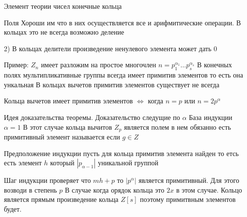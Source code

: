 Элемент теории чисел конечные кольца

Поля Хороши им что в них осуществляется все и арифмитические операции. В
кольцах это не всегда возможно деление

2) В кольцах делители произведение ненулевого элемента может дать $0$

Пример: $Z_n$ имеет разложим на простое многочлен $n = p_1^{\alpha_1}\ldots
p_s^{\alpha_s}$ В конечных полях мультипликативные группы всегда имеет примитив
элементов то есть она ункальная В кольцах вычетов примитив элементов
существует не всегда

\begin{theorem}
  Кольца вычетов имеет примитив элементов $\Leftrightarrow$ когда $n=p$ или
  $n = 2p^{\alpha}$
\end{theorem}

Идея доказательства теоремы. Доказательство следущие по $\alpha$ База
индукции $\alpha = 1$ В этот случае кольца вычитов $Z_p$ является полем в нем
обязанно есть примитивный элемент называется если $g \in Z$

Предположение индукции  пусть для кольца примитив элемента найден то етсь есть
элемент $h$ который $|p_{\alpha-1}|$ уникальной группой

Шаг индукции проверяет что $mh + p$ то $|p^{\alpha}|$ является примитивный. Для
этого возводи в степень $p$ В случае когда орядок кольца это $2x$ в этом
случае. Кольцо является прямым произведение кольца $Z[s]$ поэтому примитвным
элементов будет.